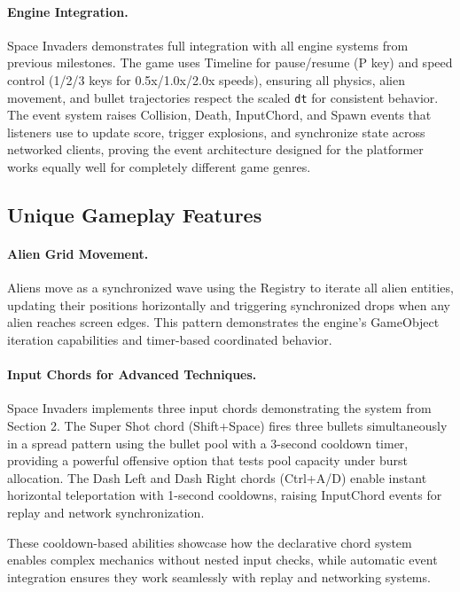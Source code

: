 \documentclass[12pt]{article}
\begin{document}
\paragraph{Engine Integration.}
Space Invaders demonstrates full integration with all engine systems from previous milestones. The game uses Timeline for pause/resume (P key) and speed control (1/2/3 keys for 0.5x/1.0x/2.0x speeds), ensuring all physics, alien movement, and bullet trajectories respect the scaled \texttt{dt} for consistent behavior. The event system raises Collision, Death, InputChord, and Spawn events that listeners use to update score, trigger explosions, and synchronize state across networked clients, proving the event architecture designed for the platformer works equally well for completely different game genres.

\subsection{Unique Gameplay Features}

\paragraph{Alien Grid Movement.}
Aliens move as a synchronized wave using the Registry to iterate all alien entities, updating their positions horizontally and triggering synchronized drops when any alien reaches screen edges. This pattern demonstrates the engine's GameObject iteration capabilities and timer-based coordinated behavior.

\paragraph{Input Chords for Advanced Techniques.}
Space Invaders implements three input chords demonstrating the system from Section 2. The Super Shot chord (Shift+Space) fires three bullets simultaneously in a spread pattern using the bullet pool with a 3-second cooldown timer, providing a powerful offensive option that tests pool capacity under burst allocation. The Dash Left and Dash Right chords (Ctrl+A/D) enable instant horizontal teleportation with 1-second cooldowns, raising InputChord events for replay and network synchronization.

These cooldown-based abilities showcase how the declarative chord system enables complex mechanics without nested input checks, while automatic event integration ensures they work seamlessly with replay and networking systems.
\end{document}
